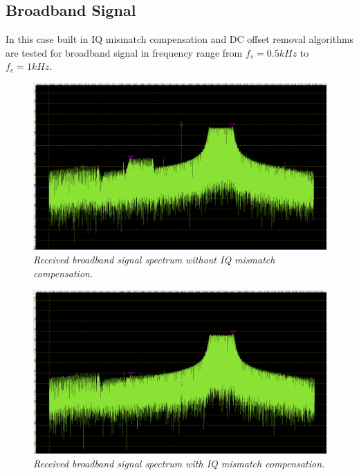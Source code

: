 \documentclass[en,printmode]{mgr}
\begin{document}
	 \subsection*{Broadband Signal}
	 	In this case built in IQ mismatch compensation and DC offset removal algorithms are
	 	tested for broadband signal in frequency range from $f_s=0.5kHz$ to $f_e=1kHz$.
   		 	\begin{figure}[!htb]
    			\centering
   				\includegraphics[width=\textwidth]{plots/real_band_off.png}
   		 		\caption{\textit{Received broadband signal spectrum without IQ mismatch compensation.}}
   		 	\end{figure}
   		 	\vspace{0.5cm}
   		 	\begin{figure}[H]
    			\centering
   				\includegraphics[width=\textwidth]{plots/real_band_on.png}
   		 		\caption{\textit{Received broadband signal spectrum with IQ mismatch compensation.}}
   		 	\end{figure}
   		 	
\end{document}
